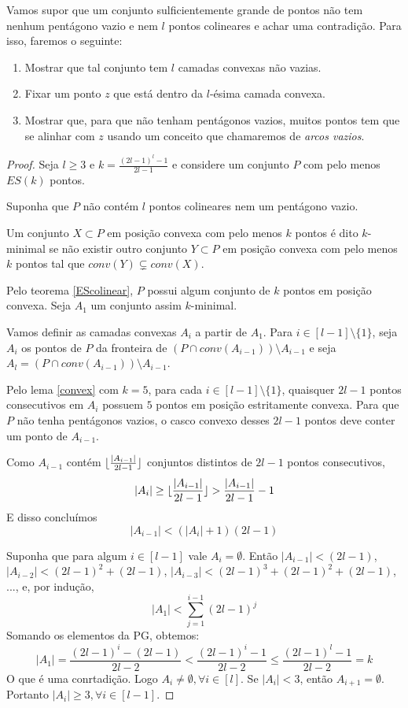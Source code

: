 \documentclass[a4paper]{book}
\DeclarePairedDelimiter\floor{\lfloor}{\rfloor}
\begin{document}
Vamos supor que um conjunto sulficientemente grande de pontos não tem nenhum pentágono vazio e nem $l$ pontos colineares e achar uma contradição. Para isso, faremos o seguinte:
\begin{enumerate}
    \item Mostrar que tal conjunto tem $l$ camadas convexas não vazias.
    \item Fixar um ponto $z$ que está dentro da $l$-ésima camada convexa.
    \item Mostrar que, para que não tenham pentágonos vazios, muitos pontos tem que se alinhar com $z$ usando um conceito que chamaremos de \textit{arcos vazios}.
\end{enumerate}

\begin{proof}
    Seja $l\geq 3$ e $k=\frac{(2l-1)^l-1}{2l-1}$ e considere um conjunto $P$ com pelo menos $ES(k)$ pontos.

    Suponha que $P$ não contém $l$ pontos colineares nem um pentágono vazio.
    
    Um conjunto $X\subset P$ em posição convexa com pelo menos $k$ pontos é dito $k$-minimal se não existir outro conjunto $Y\subset P$ em posição convexa com pelo menos $k$ pontos tal que $conv(Y)\subsetneq conv(X)$.

    Pelo teorema \ref{EScolinear}, $P$ possui algum conjunto de $k$ pontos em posição convexa. Seja $A_1$ um conjunto assim $k$-minimal.
    
    Vamos definir as camadas convexas $A_i$ a partir de $A_1$.
    Para $i\in[l-1]\setminus\{1\}$, seja $A_i$ os pontos de $P$ da fronteira de $(P\cap conv(A_{i-1})) \setminus A_{i-1}$ e seja $A_l=(P\cap conv(A_{i-1}))\setminus A_{i-1}$.

    Pelo lema \ref{convex} com $k=5$, para cada $i\in[l-1]\setminus\{1\}$, quaisquer $2l-1$ pontos consecutivos em $A_i$ possuem $5$ pontos em posição estritamente convexa. Para que $P$ não tenha pentágonos vazios, o casco convexo desses $2l-1$ pontos deve conter um ponto de $A_{i-1}$.

    Como $A_{i-1}$ contém $\floor{\frac{|A_{i-1}|}{2l-1}}$ conjuntos distintos de $2l-1$ pontos consecutivos,
    $$|A_i|\geq\floor{\frac{|A_{i-1}|}{2l-1}}>\frac{|A_{i-1}|}{2l-1}-1$$
    E disso concluímos
    $$|A_{i-1}|<(|A_i|+1)(2l-1)$$
    
    Suponha que para algum $i\in[l-1]$ vale $A_i=\emptyset$. Então $|A_{i-1}| < (2l-1)$, $|A_{i-2}| < (2l-1)^2 + (2l-1)$, $|A_{i-3}| < (2l-1)^3 + (2l-1)^2 + (2l-1)$, ..., e, por indução, 
    $$|A_1|<\sum_{j=1}^{i-1}(2l-1)^j$$
    Somando os elementos da PG, obtemos:
    $$|A_1|=\frac{(2l-1)^i-(2l-1)}{2l-2}<\frac{(2l-1)^i-1}{2l-2}\leq\frac{(2l-1)^l-1}{2l-2}=k$$
    O que é uma conrtadição. Logo $A_i\neq\emptyset, \forall i \in [l]$. Se $|A_i| < 3$, então $A_{i+1}=\emptyset$. Portanto $|A_i|\geq 3,\forall i \in [l-1]$.


\end{proof}
\end{document}
